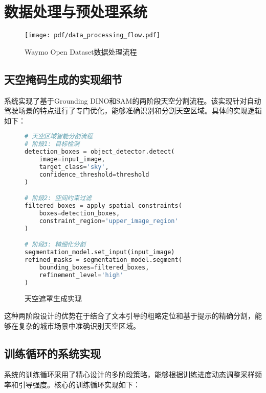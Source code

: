 \section{数据处理与预处理系统}

\begin{figure}[htbp]
  \centering
  \texttt{[image: pdf/data\_processing\_flow.pdf]}
  \caption{Waymo Open Dataset数据处理流程}
  \label{fig:data-processing-flow}
\end{figure}

\subsection{天空掩码生成的实现细节}

系统实现了基于Grounding DINO和SAM的两阶段天空分割流程。该实现针对自动驾驶场景的特点进行了专门优化，能够准确识别和分割天空区域。具体的实现逻辑如下：

\begin{figure}[!b]
  \begin{tmpbox}
    \begin{lstlisting}[language=Python]
# 天空区域智能分割流程
# 阶段1: 目标检测
detection_boxes = object_detector.detect(
    image=input_image,
    target_class='sky',
    confidence_threshold=threshold
)

# 阶段2: 空间约束过滤
filtered_boxes = apply_spatial_constraints(
    boxes=detection_boxes,
    constraint_region='upper_image_region'
)

# 阶段3: 精细化分割
segmentation_model.set_input(input_image)
refined_masks = segmentation_model.segment(
    bounding_boxes=filtered_boxes,
    refinement_level='high'
)
\end{lstlisting}
  \end{tmpbox}
  \caption{天空遮罩生成实现}
  \label{fig:sky-mask-code}
\end{figure}

这种两阶段设计的优势在于结合了文本引导的粗略定位和基于提示的精确分割，能够在复杂的城市场景中准确识别天空区域。

\subsection{训练循环的系统实现}

系统的训练循环采用了精心设计的多阶段策略，能够根据训练进度动态调整采样频率和引导强度。核心的训练循环实现如下：

